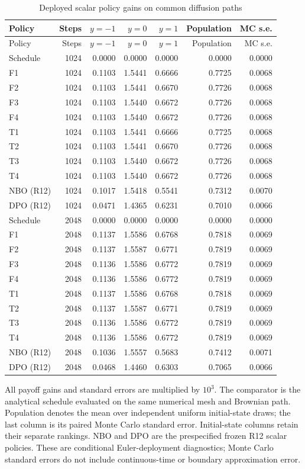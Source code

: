 \begingroup\small
\begin{longtable}{lrrrrrr}
\caption{Deployed scalar policy gains on common diffusion paths}\label{tab:r15scalarallmeshes}\\
\toprule
Policy & Steps & $y=-1$ & $y=0$ & $y=1$ & Population & MC s.e. \\
\midrule
\endfirsthead
\toprule
Policy & Steps & $y=-1$ & $y=0$ & $y=1$ & Population & MC s.e. \\
\midrule
\endhead
Schedule & 1024 & 0.0000 & 0.0000 & 0.0000 & 0.0000 & 0.0000 \\
F1 & 1024 & 0.1103 & 1.5441 & 0.6666 & 0.7725 & 0.0068 \\
F2 & 1024 & 0.1103 & 1.5441 & 0.6670 & 0.7726 & 0.0068 \\
F3 & 1024 & 0.1103 & 1.5440 & 0.6672 & 0.7726 & 0.0068 \\
F4 & 1024 & 0.1103 & 1.5440 & 0.6672 & 0.7726 & 0.0068 \\
T1 & 1024 & 0.1103 & 1.5441 & 0.6666 & 0.7725 & 0.0068 \\
T2 & 1024 & 0.1103 & 1.5441 & 0.6670 & 0.7726 & 0.0068 \\
T3 & 1024 & 0.1103 & 1.5440 & 0.6672 & 0.7726 & 0.0068 \\
T4 & 1024 & 0.1103 & 1.5440 & 0.6672 & 0.7726 & 0.0068 \\
NBO (R12) & 1024 & 0.1017 & 1.5418 & 0.5541 & 0.7312 & 0.0070 \\
DPO (R12) & 1024 & 0.0471 & 1.4365 & 0.6231 & 0.7010 & 0.0066 \\
Schedule & 2048 & 0.0000 & 0.0000 & 0.0000 & 0.0000 & 0.0000 \\
F1 & 2048 & 0.1137 & 1.5586 & 0.6768 & 0.7818 & 0.0069 \\
F2 & 2048 & 0.1137 & 1.5587 & 0.6771 & 0.7819 & 0.0069 \\
F3 & 2048 & 0.1136 & 1.5586 & 0.6772 & 0.7819 & 0.0069 \\
F4 & 2048 & 0.1136 & 1.5586 & 0.6772 & 0.7819 & 0.0069 \\
T1 & 2048 & 0.1137 & 1.5586 & 0.6768 & 0.7818 & 0.0069 \\
T2 & 2048 & 0.1137 & 1.5587 & 0.6771 & 0.7819 & 0.0069 \\
T3 & 2048 & 0.1136 & 1.5586 & 0.6772 & 0.7819 & 0.0069 \\
T4 & 2048 & 0.1136 & 1.5586 & 0.6772 & 0.7819 & 0.0069 \\
NBO (R12) & 2048 & 0.1036 & 1.5557 & 0.5683 & 0.7412 & 0.0071 \\
DPO (R12) & 2048 & 0.0468 & 1.4460 & 0.6303 & 0.7065 & 0.0066 \\
\bottomrule
\end{longtable}
\par\medskip\noindent\footnotesize All payoff gains and standard errors are multiplied by $10^3$. The comparator is the analytical schedule evaluated on the same numerical mesh and Brownian path. Population denotes the mean over independent uniform initial-state draws; the last column is its paired Monte Carlo standard error. Initial-state columns retain their separate rankings. NBO and DPO are the prespecified frozen R12 scalar policies. These are conditional Euler-deployment diagnostics; Monte Carlo standard errors do not include continuous-time or boundary approximation error.
\endgroup
